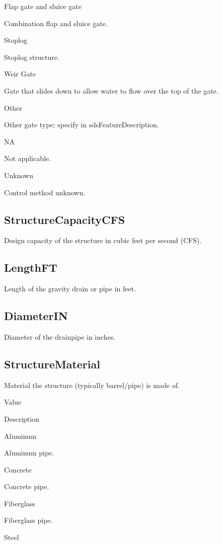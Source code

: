 \documentclass[
  letterpaper,
  DIV=11,
  numbers=noendperiod]{scrreprt}
\begin{document}
Flap gate and sluice gate

Combination flap and sluice gate.

Stoplog

Stoplog structure.

Weir Gate

Gate that slides down to allow water to flow over the top of the gate.

Other

Other gate type; specify in sdsFeatureDescription.

NA

Not applicable.

Unknown

Control method unknown.

\subsection{StructureCapacityCFS}\label{structurecapacitycfs}

Design capacity of the structure in cubic feet per second (CFS).

\subsection{LengthFT}\label{lengthft}

Length of the gravity drain or pipe in feet.

\subsection{DiameterIN}\label{diameterin}

Diameter of the drainpipe in inches.

\subsection{StructureMaterial}\label{structurematerial}

Material the structure (typically barrel/pipe) is made of.

Value

Description

Aluminum

Aluminum pipe.

Concrete

Concrete pipe.

Fiberglass

Fiberglass pipe.

Steel
\end{document}
